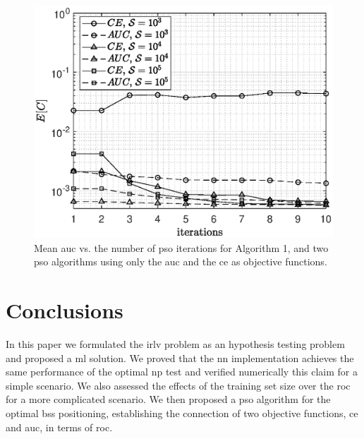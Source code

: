 \documentclass[conference,final]{IEEEtran}
\begin{document}
 
\begin{figure} 
    \centering
    \includegraphics[width=0.9\columnwidth]{res_PSO_comp.eps}
    \caption{Mean \ac{auc} vs. the number of \ac{pso} iterations for Algorithm 1, and two \ac{pso} algorithms using only the  \ac{auc} and the \ac{ce} as objective functions. }
    \label{fig:CEvsAUC}
\end{figure}

 
\section{Conclusions}
\label{sec:conc}

In this paper we formulated the \ac{irlv} problem as an hypothesis testing problem and proposed a \ac{ml} solution. We proved that the \ac{nn} implementation achieves the same performance of the optimal \ac{np} test and verified numerically this claim for a simple scenario. We also assessed the effects of the training set size over the \ac{roc} for a more complicated scenario. We then proposed a \ac{pso}  algorithm for the  optimal \acp{bs} positioning, establishing the connection of two objective functions, \ac{ce} and \ac{auc}, in terms of  \ac{roc}.


\renewcommand*{\bibfont}{\footnotesize}

\printbibliography
\end{document}
